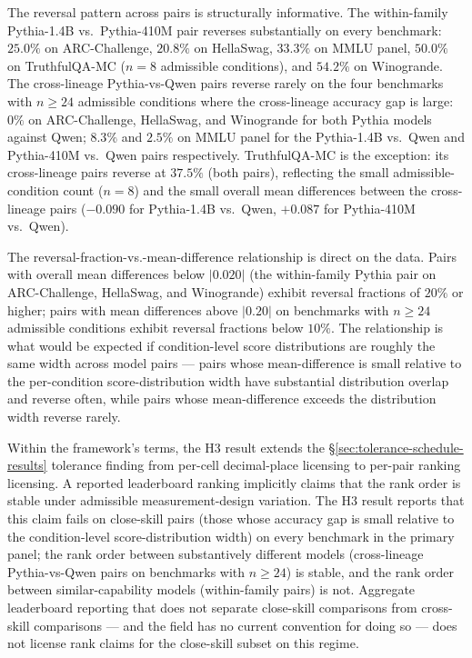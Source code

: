 \documentclass[11pt]{article}
\begin{document}
The reversal pattern across pairs is structurally informative. The within-family Pythia-1.4B vs.\ Pythia-410M pair reverses substantially on every benchmark: $25.0\%$ on ARC-Challenge, $20.8\%$ on HellaSwag, $33.3\%$ on MMLU panel, $50.0\%$ on TruthfulQA-MC ($n = 8$ admissible conditions), and $54.2\%$ on Winogrande. The cross-lineage Pythia-vs-Qwen pairs reverse rarely on the four benchmarks with $n \geq 24$ admissible conditions where the cross-lineage accuracy gap is large: $0\%$ on ARC-Challenge, HellaSwag, and Winogrande for both Pythia models against Qwen; $8.3\%$ and $2.5\%$ on MMLU panel for the Pythia-1.4B vs.\ Qwen and Pythia-410M vs.\ Qwen pairs respectively. TruthfulQA-MC is the exception: its cross-lineage pairs reverse at $37.5\%$ (both pairs), reflecting the small admissible-condition count ($n = 8$) and the small overall mean differences between the cross-lineage pairs ($-0.090$ for Pythia-1.4B vs.\ Qwen, $+0.087$ for Pythia-410M vs.\ Qwen).

The reversal-fraction-vs.-mean-difference relationship is direct on the data. Pairs with overall mean differences below $|0.020|$ (the within-family Pythia pair on ARC-Challenge, HellaSwag, and Winogrande) exhibit reversal fractions of $20\%$ or higher; pairs with mean differences above $|0.20|$ on benchmarks with $n \geq 24$ admissible conditions exhibit reversal fractions below $10\%$. The relationship is what would be expected if condition-level score distributions are roughly the same width across model pairs --- pairs whose mean-difference is small relative to the per-condition score-distribution width have substantial distribution overlap and reverse often, while pairs whose mean-difference exceeds the distribution width reverse rarely.

Within the framework's terms, the H3 result extends the §\ref{sec:tolerance-schedule-results} tolerance finding from per-cell decimal-place licensing to per-pair ranking licensing. A reported leaderboard ranking implicitly claims that the rank order is stable under admissible measurement-design variation. The H3 result reports that this claim fails on close-skill pairs (those whose accuracy gap is small relative to the condition-level score-distribution width) on every benchmark in the primary panel; the rank order between substantively different models (cross-lineage Pythia-vs-Qwen pairs on benchmarks with $n \geq 24$) is stable, and the rank order between similar-capability models (within-family pairs) is not. Aggregate leaderboard reporting that does not separate close-skill comparisons from cross-skill comparisons --- and the field has no current convention for doing so --- does not license rank claims for the close-skill subset on this regime.
\end{document}
